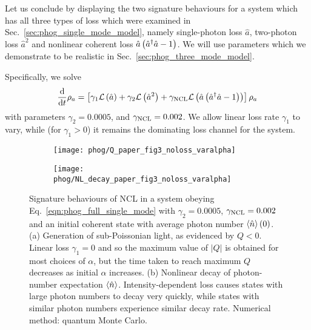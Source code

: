 Let us conclude by displaying the two signature behaviours for a system which has all three types of loss which were examined in Sec.~\ref{sec:phog_single_mode_model}, namely single-photon loss $\hat{a}$, two-photon loss $\hat{a}^2$ and nonlinear coherent loss $\hat{a}\left(\hat{a}^\dagger \hat{a} - 1\right)$. We will use parameters which we demonstrate to be realistic in Sec.~\ref{sec:phog_three_mode_model}.

Specifically, we solve
\begin{equation}\label{eqn:phog_full_single_mode}
\frac{\mathrm{d}}{\mathrm{d}t} \rho_a = \left[\gamma_1 \mathcal{L}\left(\hat{a}\right) + \gamma_2 \mathcal{L}\left(\hat{a}^2\right) + \gamma_{\text{NCL}} \mathcal{L}\left(\hat{a}\left(\hat{a}^\dagger \hat{a} - 1\right)\right) \right] \rho_a
\end{equation}
with parameters $\gamma_2 = 0.0005$, and $\gamma_{\text{NCL}} = 0.002$. We allow linear loss rate $\gamma_1$ to vary, while (for $\gamma_1 >0$) it remains the dominating loss channel for the system.

\begin{figure}[htp]
\captionsetup{width=0.8\linewidth}
\centering
	\begin{subfigure}{0.7\linewidth}
	\centering
	\caption{}
	\texttt{[image: phog/Q\_paper\_fig3\_noloss\_varalpha]}
	\end{subfigure}
	\begin{subfigure}{0.7\linewidth}
	\centering
	\caption{}
	\texttt{[image: phog/NL\_decay\_paper\_fig3\_noloss\_varalpha]}
	\end{subfigure}
\caption{\label{fig:phog_fig3paper} Signature behaviours of NCL in a system obeying Eq.~\ref{eqn:phog_full_single_mode} with $\gamma_2 = 0.0005$, $\gamma_{\text{NCL}} = 0.002$ and an initial coherent state with average photon number $\ev{\hat{n}}\left(0\right)$. (a) Generation of sub-Poissonian light, as evidenced by $Q<0$. Linear loss $\gamma_1=0$ and so the maximum value of $\left|Q\right|$ is obtained for most choices of $\alpha$, but the time taken to reach maximum $Q$ decreases as initial $\alpha$ increases. (b) Nonlinear decay of photon-number expectation $\ev{\hat{n}}$. Intensity-dependent loss causes states with large photon numbers to decay very quickly, while states with similar photon numbers experience similar decay rate. Numerical method: quantum Monte Carlo.}
\end{figure}

